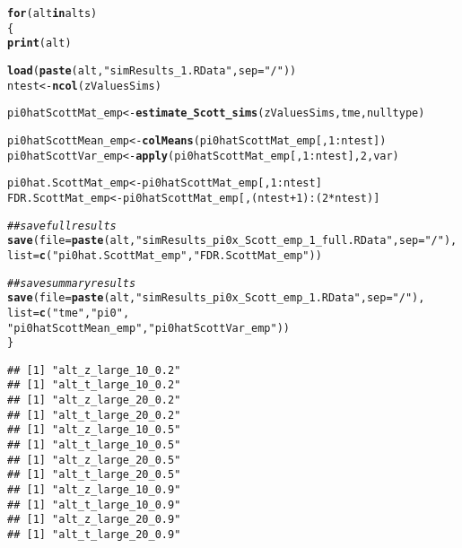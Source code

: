 \documentclass{article}\usepackage[]{graphicx}\usepackage[]{color}
\makeatletter
\newcommand{\hlnum}[1]{\textcolor[rgb]{0.686,0.059,0.569}{#1}}%
\newcommand{\hlstr}[1]{\textcolor[rgb]{0.192,0.494,0.8}{#1}}%
\newcommand{\hlcom}[1]{\textcolor[rgb]{0.678,0.584,0.686}{\textit{#1}}}%
\newcommand{\hlopt}[1]{\textcolor[rgb]{0,0,0}{#1}}%
\newcommand{\hlstd}[1]{\textcolor[rgb]{0.345,0.345,0.345}{#1}}%
\newcommand{\hlkwa}[1]{\textcolor[rgb]{0.161,0.373,0.58}{\textbf{#1}}}%
\newcommand{\hlkwb}[1]{\textcolor[rgb]{0.69,0.353,0.396}{#1}}%
\newcommand{\hlkwc}[1]{\textcolor[rgb]{0.333,0.667,0.333}{#1}}%
\newcommand{\hlkwd}[1]{\textcolor[rgb]{0.737,0.353,0.396}{\textbf{#1}}}%
\newenvironment{kframe}{%
 \def\at@end@of@kframe{}%
 \ifinner\ifhmode%
  \def\at@end@of@kframe{\end{minipage}}%
  \begin{minipage}{\columnwidth}%
 \fi\fi%
 \def\FrameCommand##1{\hskip\@totalleftmargin \hskip-\fboxsep
 \colorbox{shadecolor}{##1}\hskip-\fboxsep
     \hskip-\linewidth \hskip-\@totalleftmargin \hskip\columnwidth}%
 \MakeFramed {\advance\hsize-\width
   \@totalleftmargin\z@ \linewidth\hsize
   \@setminipage}}%
 {\par\unskip\endMakeFramed%
 \at@end@of@kframe}
\newenvironment{knitrout}{}{} %
\makeatother
\begin{document}
\begin{knitrout}
\color{fgcolor}\begin{kframe}
\begin{alltt}
\hlkwa{for}\hlstd{(alt} \hlkwa{in} \hlstd{alts)}
\hlstd{\{}
  \hlkwd{print}\hlstd{(alt)}

  \hlkwd{load}\hlstd{(}\hlkwd{paste}\hlstd{(alt,}\hlstr{"simResults_1.RData"}\hlstd{,}\hlkwc{sep}\hlstd{=}\hlstr{"/"}\hlstd{))}
  \hlstd{ntest} \hlkwb{<-} \hlkwd{ncol}\hlstd{(zValuesSims)}

  \hlstd{pi0hatScottMat_emp} \hlkwb{<-} \hlkwd{estimate_Scott_sims}\hlstd{(zValuesSims, tme, nulltype)}

  \hlstd{pi0hatScottMean_emp} \hlkwb{<-} \hlkwd{colMeans}\hlstd{(pi0hatScottMat_emp[,}\hlnum{1}\hlopt{:}\hlstd{ntest])}
  \hlstd{pi0hatScottVar_emp} \hlkwb{<-} \hlkwd{apply}\hlstd{(pi0hatScottMat_emp[,}\hlnum{1}\hlopt{:}\hlstd{ntest],}\hlnum{2}\hlstd{,var)}

  \hlstd{pi0hat.ScottMat_emp} \hlkwb{<-} \hlstd{pi0hatScottMat_emp[,}\hlnum{1}\hlopt{:}\hlstd{ntest]}
  \hlstd{FDR.ScottMat_emp} \hlkwb{<-} \hlstd{pi0hatScottMat_emp[,(ntest}\hlopt{+}\hlnum{1}\hlstd{)}\hlopt{:}\hlstd{(}\hlnum{2}\hlopt{*}\hlstd{ntest)]}

  \hlcom{##save full results}
  \hlkwd{save}\hlstd{(}\hlkwc{file}\hlstd{=}\hlkwd{paste}\hlstd{(alt,}\hlstr{"simResults_pi0x_Scott_emp_1_full.RData"}\hlstd{,}\hlkwc{sep}\hlstd{=}\hlstr{"/"}\hlstd{),}
       \hlkwc{list}\hlstd{=}\hlkwd{c}\hlstd{(}\hlstr{"pi0hat.ScottMat_emp"}\hlstd{,} \hlstr{"FDR.ScottMat_emp"}\hlstd{))}

  \hlcom{##save summary results}
  \hlkwd{save}\hlstd{(}\hlkwc{file}\hlstd{=}\hlkwd{paste}\hlstd{(alt,}\hlstr{"simResults_pi0x_Scott_emp_1.RData"}\hlstd{,}\hlkwc{sep}\hlstd{=}\hlstr{"/"}\hlstd{),}
       \hlkwc{list}\hlstd{=}\hlkwd{c}\hlstd{(}\hlstr{"tme"}\hlstd{,} \hlstr{"pi0"}\hlstd{,}
            \hlstr{"pi0hatScottMean_emp"}\hlstd{,}\hlstr{"pi0hatScottVar_emp"}\hlstd{))}
\hlstd{\}}
\end{alltt}
\begin{verbatim}
## [1] "alt_z_large_10_0.2"
## [1] "alt_t_large_10_0.2"
## [1] "alt_z_large_20_0.2"
## [1] "alt_t_large_20_0.2"
## [1] "alt_z_large_10_0.5"
## [1] "alt_t_large_10_0.5"
## [1] "alt_z_large_20_0.5"
## [1] "alt_t_large_20_0.5"
## [1] "alt_z_large_10_0.9"
## [1] "alt_t_large_10_0.9"
## [1] "alt_z_large_20_0.9"
## [1] "alt_t_large_20_0.9"
\end{verbatim}
\end{kframe}
\end{knitrout}
\end{document}
